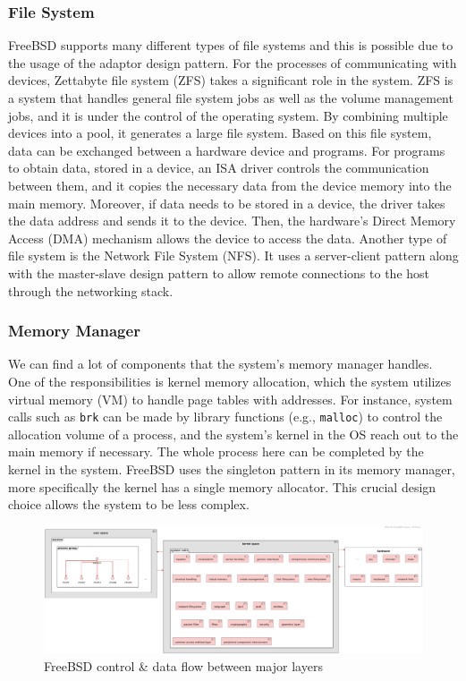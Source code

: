 \documentclass[12pt, dvipsnames, a4paper]{article}
\newcommand{\code}[1]{\texttt{#1}}
\begin{document}
\subsubsection{File System}
FreeBSD supports many different types of file systems and this is possible due to the usage of the adaptor design pattern. For the processes of communicating with devices, Zettabyte file system (ZFS) takes a significant role in the system. ZFS is a system that handles general file system jobs as well as the volume management jobs, and it is under the control of the operating system. By combining multiple devices into a pool, it generates a large file system. Based on this file system, data can be exchanged between a hardware device and programs. For programs to obtain data, stored in a device, an ISA driver controls the communication between them, and it copies the necessary data from the device memory into the main memory. Moreover, if data needs to be stored in a device, the driver takes the data address and sends it to the device. Then, the hardware's Direct Memory Access (DMA) mechanism allows the device to access the data. Another type of file system is the Network File System (NFS). It uses a server-client pattern along with the master-slave design pattern to allow remote connections to the host through the networking stack.\par
\subsubsection{Memory Manager}
We can find a lot of components that the system's memory manager handles. One of the responsibilities is kernel memory allocation, which the system utilizes virtual memory (VM) to handle page tables with addresses. For instance, system calls such as \code{brk} can be made by library functions (e.g., \code{malloc}) to control the allocation volume of a process, and the system's kernel in the OS reach out to the main memory if necessary. The whole process here can be completed by the kernel in the system. FreeBSD uses the singleton pattern in its memory manager, more specifically the kernel has a single memory allocator. This crucial design choice allows the system to be less complex.\par
\begin{figure}[!htb]
	\centering
	\includegraphics[width = 550pt]{assets/system_diagrams/kernel-organization.pdf}
	\caption{FreeBSD control \& data flow between major layers}
\end{figure}
\clearpage
\end{document}
